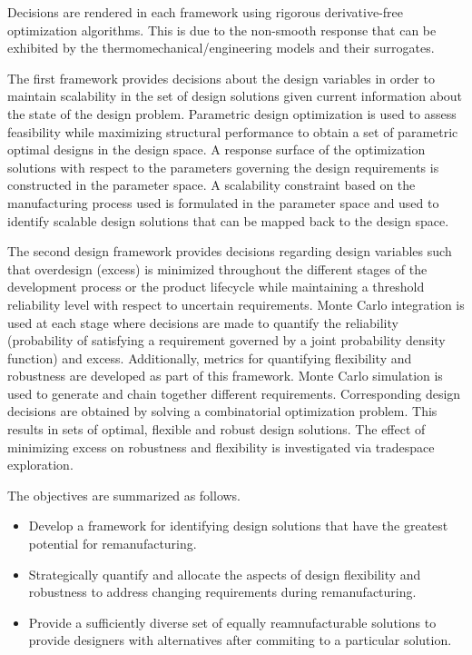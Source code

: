 Decisions are rendered in each framework using rigorous derivative-free optimization algorithms. This is due to the non-smooth response that can be exhibited by the thermomechanical/engineering models and their surrogates.

The first framework provides decisions about the design variables in order to maintain scalability in the set of design solutions given current information about the state of the design problem. Parametric design optimization is used to assess feasibility while maximizing structural performance to obtain a set of parametric optimal designs in the design space. A response surface of the optimization solutions with respect to the parameters governing the design requirements is constructed in the parameter space. A scalability constraint based on the manufacturing process used is formulated in the parameter space and used to identify scalable design solutions that can be mapped back to the design space.

The second design framework provides decisions regarding design variables such that overdesign (excess) is minimized throughout the different stages of the development process or the product lifecycle while maintaining a threshold reliability level with respect to uncertain requirements. Monte Carlo integration is used at each stage where decisions are made to quantify the reliability (probability of satisfying a requirement governed by a joint probability density function) and excess. Additionally, metrics for quantifying flexibility and robustness are developed as part of this framework. Monte Carlo simulation is used to generate and chain together different requirements. Corresponding design decisions are obtained by solving a combinatorial optimization problem. This results in sets of optimal, flexible and robust design solutions. The effect of minimizing excess on robustness and flexibility is investigated via tradespace exploration.

The objectives are summarized as follows.

\begin{itemize}
	\item{Develop a framework for identifying design solutions that have the greatest potential for remanufacturing.}
	\item{Strategically quantify and allocate the aspects of design flexibility and robustness to address changing requirements during remanufacturing.}
	\item{Provide a sufficiently diverse set of equally reamnufacturable solutions to provide designers with alternatives after commiting to a particular solution.}
\end{itemize}

